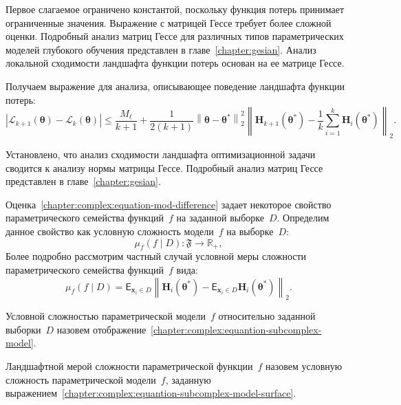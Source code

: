 Первое слагаемое ограничено константой, поскольку функция потерь принимает ограниченные значения. Выражение с матрицей Гессе требует более сложной оценки. Подробный анализ матриц Гессе для различных типов параметрических моделей глубокого обучения представлен в главе~\ref{chapter:gesian}. Анализ локальной сходимости ландшафта функции потерь основан на ее матрице Гессе.

Получаем выражение для анализа, описывающее поведение ландшафта функции потерь:
\begin{equation}\label{chapter:complex:equation-mod-difference}
    \left| \mathcal{L}_{k+1}(\boldsymbol{\theta}) - \mathcal{L}_k(\boldsymbol{\theta}) \right| \leqslant \frac{M_{\ell}}{k+1}+ \frac{1}{2(k+1)} \left\|\boldsymbol{\theta} - \boldsymbol{\theta}^*\right\|_2^2 \left\| \mathbf{H}_{k+1}(\boldsymbol{\theta}^*) - \frac{1}{k} \sum\limits_{i=1}^{k} \mathbf{H}_{i}(\boldsymbol{\theta}^*) \right\|_2.
\end{equation}

Установлено, что анализ сходимости ландшафта оптимизационной задачи сводится к анализу нормы матрицы Гессе. Подробный анализ матриц Гессе представлен в главе~\ref{chapter:gesian}.

Оценка~\eqref{chapter:complex:equation-mod-difference} задает некоторое свойство параметрического семейства функций~$f$ на заданной выборке~$D$. Определим данное свойство как условную сложность модели~$f$ на выборке~$D$:
\begin{equation}\label{chapter:complex:equantion-subcomplex-model}
    \mu_f(f\mid D) : \mathfrak{F} \to \mathbb{R}_+,
\end{equation}
Более подробно рассмотрим частный случай условной меры сложности параметрического семейства функций~$f$ вида:
\begin{equation}\label{chapter:complex:equantion-subcomplex-model-surface}
    \mu_f(f\mid D) = \mathsf{E}_{\mathbf{x}_i\in D}\left\| \mathbf{H}_{i}(\boldsymbol{\theta}^*) -  \mathsf{E}_{\mathbf{x}_i\in D}\mathbf{H}_{i}(\boldsymbol{\theta}^*) \right\|_2.
\end{equation}

\begin{definition}\label{chapter:complex:definition-subcomplex-model}
    Условной сложностью параметрической модели~$f$ относительно заданной выборки~$D$ назовем отображение~\eqref{chapter:complex:equantion-subcomplex-model}.
\end{definition}

\begin{definition}\label{chapter:complex:definition-subcomplex-model-surface}
    Ландшафтной мерой сложности параметрической функции~$f$ назовем условную сложность параметрической модели~$f$, заданную выражением~\eqref{chapter:complex:equantion-subcomplex-model-surface}.
\end{definition}


